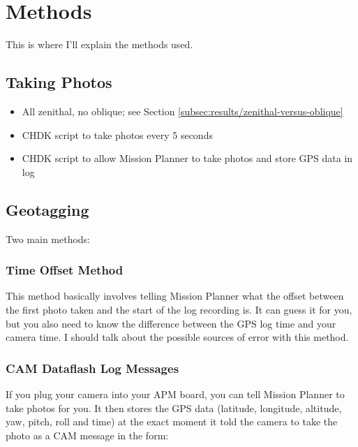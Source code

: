 \section{Methods}

This is where I'll explain the methods used.

\subsection{Taking Photos} %

\begin{itemize}

\item All zenithal, no oblique; see Section
    \ref{subsec:results/zenithal-versus-oblique}

\item CHDK script to take photos every 5 seconds

\item CHDK script to allow Mission Planner to take photos and store GPS data in
log

\end{itemize}

\subsection{Geotagging}

Two main methods:

\subsubsection{Time Offset Method}

This method basically involves telling Mission Planner what the offset between
the first photo taken and the start of the log recording is. It can guess it for
you, but you also need to know the difference between the GPS log time and your
camera time. I should talk about the possible sources of error with this method.

\subsubsection{CAM Dataflash Log Messages}

If you plug your camera into your APM board, you can tell Mission Planner to
take photos for you. It then stores the GPS data (latitude, longitude, altitude,
yaw, pitch, roll and time) at the exact moment it told the camera to take the
photo as a CAM message in the form:

